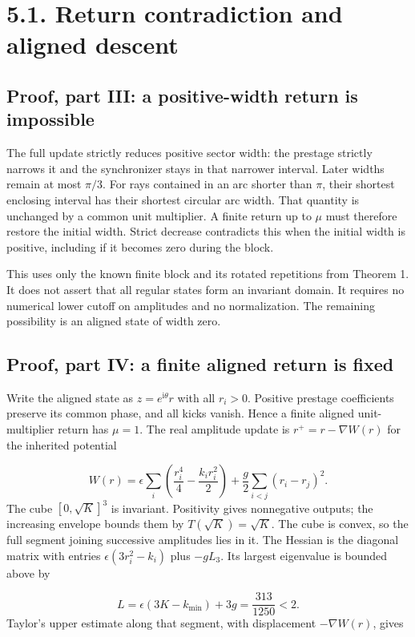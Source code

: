 \documentclass[11pt,a4paper]{article}
\begin{document}
\clearpage
\section*{5.1. Return contradiction and aligned descent}
\subsection*{Proof, part III: a positive-width return is impossible}
The full update strictly reduces positive sector width: the prestage strictly narrows it and the synchronizer stays in that narrower interval. Later widths remain at most $\pi/3$. For rays contained in an arc shorter than $\pi$, their shortest enclosing interval has their shortest circular arc width. That quantity is unchanged by a common unit multiplier. A finite return up to $\mu$ must therefore restore the initial width. Strict decrease contradicts this when the initial width is positive, including if it becomes zero during the block.

This uses only the known finite block and its rotated repetitions from Theorem 1. It does not assert that all regular states form an invariant domain. It requires no numerical lower cutoff on amplitudes and no normalization. The remaining possibility is an aligned state of width zero.

\subsection*{Proof, part IV: a finite aligned return is fixed}
Write the aligned state as $z=e^{\mathrm{i}\theta}r$ with all $r_i>0$. Positive prestage coefficients preserve its common phase, and all kicks vanish. Hence a finite aligned unit-multiplier return has $\mu=1$. The real amplitude update is $r^+=r-\nabla W(r)$ for the inherited potential \cite{D1}

\begin{equation}W(r)=\epsilon\sum_i\left(\frac{r_i^4}{4}-\frac{k_i r_i^2}{2}\right)+\frac{g}{2}\sum_{i<j}(r_i-r_j)^2.\end{equation}
The cube $[0,\sqrt{K}]^3$ is invariant. Positivity gives nonnegative outputs; the increasing envelope bounds them by $T(\sqrt{K})=\sqrt{K}$. The cube is convex, so the full segment joining successive amplitudes lies in it. The Hessian is the diagonal matrix with entries $\epsilon(3r_i^2-k_i)$ plus $-gL_3$. Its largest eigenvalue is bounded above by

\begin{equation}L=\epsilon(3K-k_{\min})+3g=\frac{313}{1250}<2.\end{equation}
Taylor’s upper estimate along that segment, with displacement $-\nabla W(r)$, gives
\end{document}
